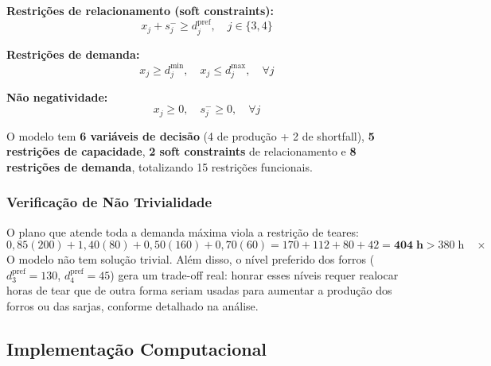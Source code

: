 \textbf{Restrições de relacionamento (soft constraints):}
\begin{equation}
  x_j + s_j^- \geq d_j^{\text{pref}}, \quad j \in \{3, 4\}
  \label{eq:soft}
\end{equation}

\textbf{Restrições de demanda:}
\begin{equation}
  x_j \geq d_j^{\min}, \quad x_j \leq d_j^{\max}, \quad \forall j
  \label{eq:dem}
\end{equation}

\textbf{Não negatividade:}
\begin{equation}
  x_j \geq 0, \quad s_j^- \geq 0, \quad \forall j
\end{equation}

O modelo tem \textbf{6 variáveis de decisão} (4 de produção + 2 de shortfall),
\textbf{5 restrições de capacidade}, \textbf{2 soft constraints} de relacionamento
e \textbf{8 restrições de demanda}, totalizando 15 restrições funcionais.

\subsubsection{Verificação de Não Trivialidade}

O plano que atende toda a demanda máxima viola a restrição de teares:
\[
  0{,}85(200) + 1{,}40(80) + 0{,}50(160) + 0{,}70(60)
  = 170 + 112 + 80 + 42 = \mathbf{404 \; \text{h}} > 380 \; \text{h} \quad \times
\]
O modelo não tem solução trivial. Além disso, o nível preferido dos forros
($d_3^{\text{pref}} = 130$, $d_4^{\text{pref}} = 45$) gera um trade-off real:
honrar esses níveis requer realocar horas de tear que de outra forma seriam usadas
para aumentar a produção dos forros ou das sarjas, conforme detalhado na análise.

\newpage

\subsection{Implementação Computacional}
\label{sec:impl}

